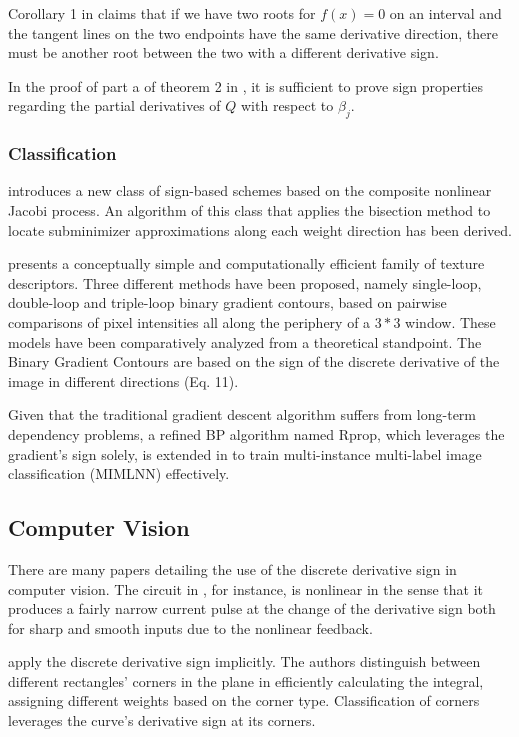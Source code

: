 \documentclass[11pt]{book}
\begin{document}
Corollary 1 in \cite{pan2020implicit} claims that if we have two
roots for $f\left(x\right)=0$ on an interval and the tangent lines
on the two endpoints have the same derivative direction, there must
be another root between the two with a different derivative sign.

In the proof of part a of theorem 2 in \cite{xue2020regularized},
it is sufficient to prove sign properties regarding the partial derivatives
of $Q$ with respect to $\beta_{j}$.

\subsubsection{Classification}

\cite{anastasiadis2005sign} introduces a new class of sign-based
schemes based on the composite nonlinear Jacobi process. An algorithm
of this class that applies the bisection method to locate subminimizer
approximations along each weight direction has been derived.

\cite{fernandez2011image} presents a conceptually simple and computationally
efficient family of texture descriptors. Three different methods have
been proposed, namely single-loop, double-loop and triple-loop binary
gradient contours, based on pairwise comparisons of pixel intensities
all along the periphery of a $3*3$ window. These models have been
comparatively analyzed from a theoretical standpoint. The Binary Gradient
Contours are based on the sign of the discrete derivative of the image
in different directions (Eq. 11).

Given that the traditional gradient descent algorithm suffers from
long-term dependency problems, a refined BP algorithm named Rprop,
which leverages the gradient's sign solely, is extended in \cite{chen2013multi}
to train multi-instance multi-label image classification (MIMLNN)
effectively.

\subsection{Computer Vision}

There are many papers detailing the use of the discrete derivative
sign in computer vision. The circuit in \cite{higgins2000modular},
for instance, is nonlinear in the sense that it produces a fairly
narrow current pulse at the change of the derivative sign both for
sharp and smooth inputs due to the nonlinear feedback.

\cite{viola2001rapid,wang2007shape} apply the discrete derivative
sign implicitly. The authors distinguish between different rectangles'
corners in the plane in efficiently calculating the integral, assigning
different weights based on the corner type. Classification of corners
leverages the curve's derivative sign at its corners.
\end{document}
